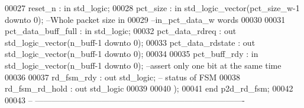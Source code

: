 \begin{DoxyCode}
00027       \textcolor{vhdlchar}{reset_n}              \textcolor{vhdlchar}{:} \textcolor{keywordflow}{in} \textcolor{comment}{std\_logic};
00028       \textcolor{vhdlchar}{pct_size}             \textcolor{vhdlchar}{:} \textcolor{keywordflow}{in} \textcolor{comment}{std\_logic\_vector}\textcolor{vhdlchar}{(}\textcolor{vhdlchar}{pct_size_w}\textcolor{vhdlchar}{-}\textcolor{vhdllogic}{}\textcolor{vhdllogic}{1} \textcolor{keywordflow}{downto} \textcolor{vhdllogic}{}\textcolor{vhdllogic}{0}\textcolor{vhdlchar}{)};\textcolor{keyword}{   --Whole packet size in }
00029 \textcolor{keyword}{                                                                           --in\_pct\_data\_w words}
00030      
00031       \textcolor{vhdlchar}{pct_data_buff_full}   \textcolor{vhdlchar}{:} \textcolor{keywordflow}{in} \textcolor{comment}{std\_logic};
00032       \textcolor{vhdlchar}{pct_data_rdreq}       \textcolor{vhdlchar}{:} \textcolor{keywordflow}{out} \textcolor{comment}{std\_logic\_vector}\textcolor{vhdlchar}{(}\textcolor{vhdlchar}{n_buff}\textcolor{vhdlchar}{-}\textcolor{vhdllogic}{}\textcolor{vhdllogic}{1} \textcolor{keywordflow}{downto} \textcolor{vhdllogic}{}\textcolor{vhdllogic}{0}\textcolor{vhdlchar}{)};
00033       \textcolor{vhdlchar}{pct_data_rdstate}     \textcolor{vhdlchar}{:} \textcolor{keywordflow}{out} \textcolor{comment}{std\_logic\_vector}\textcolor{vhdlchar}{(}\textcolor{vhdlchar}{n_buff}\textcolor{vhdlchar}{-}\textcolor{vhdllogic}{}\textcolor{vhdllogic}{1} \textcolor{keywordflow}{downto} \textcolor{vhdllogic}{}\textcolor{vhdllogic}{0}\textcolor{vhdlchar}{)};
00034 
00035       \textcolor{vhdlchar}{pct_buff_rdy}         \textcolor{vhdlchar}{:} \textcolor{keywordflow}{in} \textcolor{comment}{std\_logic\_vector}\textcolor{vhdlchar}{(}\textcolor{vhdlchar}{n_buff}\textcolor{vhdlchar}{-}\textcolor{vhdllogic}{}\textcolor{vhdllogic}{1} \textcolor{keywordflow}{downto} \textcolor{vhdllogic}{}\textcolor{vhdllogic}{0}\textcolor{vhdlchar}{)};\textcolor{keyword}{   --assert only one bit at the same
       time}
00036       
00037       \textcolor{vhdlchar}{rd_fsm_rdy}           \textcolor{vhdlchar}{:} \textcolor{keywordflow}{out} \textcolor{comment}{std\_logic};\textcolor{keyword}{ -- status of FSM}
00038       \textcolor{vhdlchar}{rd_fsm_rd_hold}       \textcolor{vhdlchar}{:} \textcolor{keywordflow}{out} \textcolor{comment}{std\_logic}
00039       
00040         \textcolor{vhdlchar}{)};
00041 \textcolor{keywordflow}{end} \textcolor{vhdlchar}{p2d\_rd\_fsm};
00042 
00043 \textcolor{keyword}{-- ----------------------------------------------------------------------------}

\end{DoxyCode}
